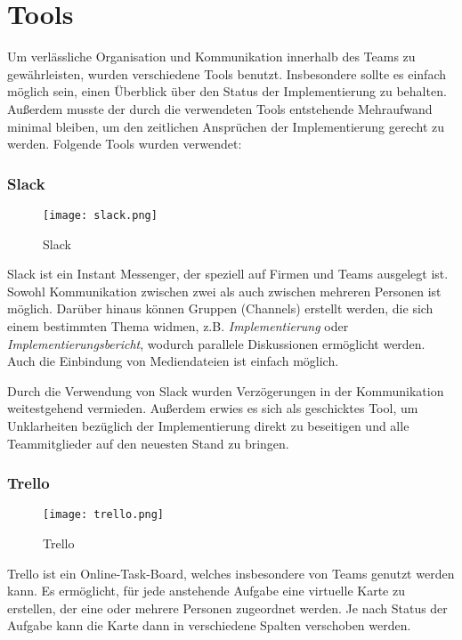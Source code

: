 \part{Tools}

Um verlässliche Organisation und Kommunikation innerhalb des Teams zu gewährleisten, wurden verschiedene Tools benutzt.
Insbesondere sollte es einfach möglich sein, einen Überblick über den Status der Implementierung zu behalten.
Außerdem musste der durch die verwendeten Tools entstehende Mehraufwand minimal bleiben, um den zeitlichen Ansprüchen der Implementierung gerecht zu werden.
Folgende Tools wurden verwendet:

\section{Slack}

\begin{figure}[H]
\caption{Slack}
\centering
\texttt{[image: slack.png]}
\end{figure}

Slack ist ein Instant Messenger, der speziell auf Firmen und Teams ausgelegt ist.
Sowohl Kommunikation zwischen zwei als auch zwischen mehreren Personen ist möglich.
Darüber hinaus können Gruppen (Channels) erstellt werden, die sich einem bestimmten Thema widmen, z.B. \textit{Implementierung} oder \textit{Implementierungsbericht}, wodurch parallele Diskussionen ermöglicht werden.
Auch die Einbindung von Mediendateien ist einfach möglich.

Durch die Verwendung von Slack wurden Verzögerungen in der Kommunikation weitestgehend vermieden. 
Außerdem erwies es sich als geschicktes Tool, um Unklarheiten bezüglich der Implementierung direkt zu beseitigen und alle Teammitglieder auf den neuesten Stand zu bringen.

\newpage
\section{Trello}

\begin{figure}[H]
\caption{Trello}
\centering
\texttt{[image: trello.png]}
\end{figure}

Trello ist ein Online-Task-Board, welches insbesondere von Teams genutzt werden kann.
Es ermöglicht, für jede anstehende Aufgabe eine virtuelle Karte zu erstellen, der eine oder mehrere Personen zugeordnet werden.
Je nach Status der Aufgabe kann die Karte dann in verschiedene Spalten verschoben werden.

